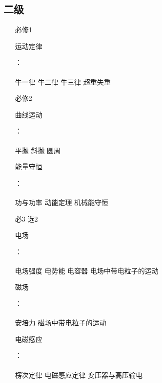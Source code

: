 \documentclass{ctexbook}
\newcommand{\helpreflast}[1]{
\hypertarget{#1}{#1}
}
\begin{document}
\newpage
\subsection{二级}
\begin{enumerate}
\item [必修1  \quad ]

\helpreflast{运动定律}： \\\\
\hyperlink{题目区域}{\faBackward}  \quad  \quad 牛一律  \quad 牛二律  \quad 牛三律  \quad 超重失重 \quad \quad \hyperlink{思想方法}{\faForward}

\newpage

\item [必修2  \quad ]

\helpreflast{曲线运动}： \\\\
 \hyperlink{题目区域}{\faBackward}  \quad  \quad  平抛  \quad 斜抛 \quad 圆周 \quad \quad \hyperlink{思想方法}{\faForward}

\newpage

\helpreflast{能量守恒}： \\\\
  \hyperlink{题目区域}{\faBackward}   \quad  \quad 功与功率 \quad  \quad  动能定理 \quad 机械能守恒	 \quad \quad \hyperlink{思想方法}{\faForward}

\newpage

\item [必3  选2  \quad ]

\helpreflast{电场}： \\\\
  \hyperlink{题目区域}{\faBackward}  \quad  \quad  电场强度 \quad 电势能 \quad 电容器 \quad 电场中带电粒子的运动 \quad \quad \hyperlink{思想方法}{\faForward}

\newpage

\helpreflast{磁场}：\\\\
\hyperlink{题目区域}{\faBackward}  \quad  \quad 安培力  \quad 磁场中带电粒子的运动 \quad \quad \hyperlink{思想方法}{\faForward}



\newpage

\helpreflast{电磁感应}： \\\\
 \hyperlink{题目区域}{\faBackward}  \quad  \quad   楞次定律 \quad 电磁感应定律 \quad 变压器与高压输电 \quad \quad \hyperlink{思想方法}{\faForward}


\end{enumerate}
\end{document}
